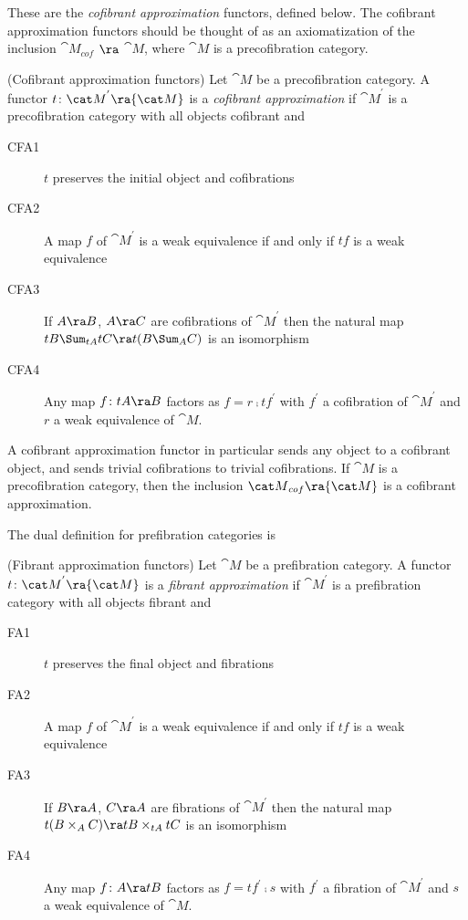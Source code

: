 These are the {\it cofibrant approximation} functors, defined below. The cofibrant approximation functors should be thought of as an axiomatization of the inclusion ${\cat M}_{cof}$ $\ra$ ${\cat M}$, where ${\cat M}$ is a precofibration category.

\begin{defn}(Cofibrant approximation functors)
\label{defn::cofapproximation}
\mbox{}
Let ${\cat M}$ be a precofibration category. A functor $t \colon {\cat M}^{'} \ra {\cat M}$ is a {\it cofibrant approximation} if ${\cat M}^{'}$ is a precofibration category with all objects cofibrant and
\begin{description}
\item[CFA1]
$t$ preserves the initial object and cofibrations
\item[CFA2]
A map $f$ of ${\cat M}^{'}$ is a weak equivalence if and only if $tf$ is a weak equivalence
\item[CFA3]
If $A \ra B$, $A \ra C$ are cofibrations of ${\cat M}^{'}$ then the natural map $tB \Sum_{tA} tC \ra t(B \Sum_{A} C)$ is an isomorphism
\item[CFA4]
Any map $f \colon tA \ra B$ factors as $f = r \comp tf^{'}$ with $f^{'}$ a cofibration of ${\cat M}^{'}$ and $r$ a weak equivalence of ${\cat M}$.
\end{description}
\end{defn}

A cofibrant approximation functor in particular sends any object to a cofibrant object, and sends trivial cofibrations to trivial cofibrations. If ${\cat M}$ is a precofibration category, then the inclusion ${\cat M}_{cof} \ra {\cat M}$ is a cofibrant approximation.

The dual definition for prefibration categories is

\begin{defn}(Fibrant approximation functors)
\label{defn::fibapproximation}
\mbox{}
Let ${\cat M}$ be a prefibration category. A functor $t \colon {\cat M}^{'} \ra {\cat M}$ is a {\it fibrant approximation} if ${\cat M}^{'}$ is a prefibration category with all objects fibrant and
\begin{description}
\item[FA1]
$t$ preserves the final object and fibrations
\item[FA2]
A map $f$ of ${\cat M}^{'}$ is a weak equivalence if and only if $tf$ is a weak equivalence
\item[FA3]
If $B \ra A$, $C \ra A$ are fibrations of ${\cat M}^{'}$ then the natural map $ t(B \times_{A} C) \ra tB \times_{tA} tC$ is an isomorphism
\item[FA4]
Any map $f \colon A \ra tB$ factors as $f = tf^{'} \comp s$ with $f^{'}$ a fibration of ${\cat M}^{'}$ and $s$ a weak equivalence of ${\cat M}$.
\end{description}
\end{defn}

